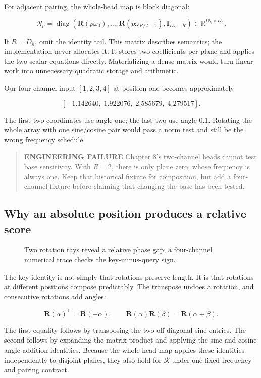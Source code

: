 \documentclass[
  10pt,
]{article}
\begin{document}
For adjacent pairing, the whole-head map is block diagonal:

\[
\mathcal{R}_p=
\operatorname{diag}\!\left(
\mathbf{R}(p\omega_0),\ldots,
\mathbf{R}(p\omega_{R/2-1}),\mathbf{I}_{D_h-R}\right)
\in\mathbb{R}^{D_h\times D_h}.
\]

If \(R=D_h\), omit the identity tail. This matrix describes semantics;
the implementation never allocates it. It stores two coefficients per
plane and applies the two scalar equations directly. Materializing a
dense matrix would turn linear work into unnecessary quadratic storage
and arithmetic.

Our four-channel input \([1,2,3,4]\) at position one becomes
approximately

\[
[-1.142640,\;1.922076,\;2.585679,\;4.279517].
\]

The first two coordinates use angle one; the last two use angle \(0.1\).
Rotating the whole array with one sine/cosine pair would pass a norm
test and still be the wrong frequency schedule.

\begin{quote}
\textbf{ENGINEERING FAILURE} Chapter 8's two-channel heads cannot test
base sensitivity. With \(R=2\), there is only plane zero, whose
frequency is always one. Keep that historical fixture for composition,
but add a four-channel fixture before claiming that changing the base
has been tested.
\end{quote}

\subsection{Why an absolute position produces a relative
score}\label{why-an-absolute-position-produces-a-relative-score}

\begin{figure}[H]\centering\resizebox{\linewidth}{!}{}\caption{Two rotation rays reveal a relative phase gap; a four-channel numerical trace checks the key-minus-query sign.}\end{figure}

The key identity is not simply that rotations preserve length. It is
that rotations at different positions compose predictably. The transpose
undoes a rotation, and consecutive rotations add angles:

\[
\mathbf{R}(\alpha)^{\mathsf T}=\mathbf{R}(-\alpha),\qquad
\mathbf{R}(\alpha)\mathbf{R}(\beta)=\mathbf{R}(\alpha+\beta).
\]

The first equality follows by transposing the two off-diagonal sine
entries. The second follows by expanding the matrix product and applying
the sine and cosine angle-addition identities. Because the whole-head
map applies these identities independently to disjoint planes, they also
hold for \(\mathcal{R}\) under one fixed frequency and pairing contract.
\end{document}

